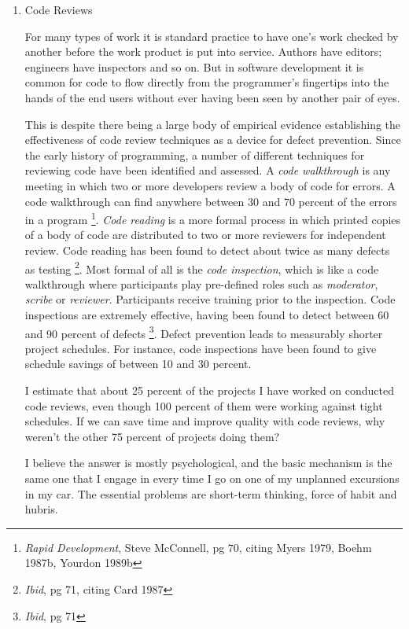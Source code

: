 \documentclass{article}
\begin{document}
\begin{enumerate}
\item Code Reviews
\label{sec:orgheadline274}

For many types of work it is standard practice to have one's work
checked by another before the work product is put into service. Authors
have editors; engineers have inspectors and so on. But in software
development it is common for code to flow directly from the programmer's
fingertips into the hands of the end users without ever having been seen
by another pair of eyes.

This is despite there being a large body of empirical evidence
establishing the effectiveness of code review techniques as a device for
defect prevention. Since the early history of programming, a number of
different techniques for reviewing code have been identified and
assessed. A \emph{code walkthrough} is any meeting in which two or more
developers review a body of code for errors. A code walkthrough can find
anywhere between 30 and 70 percent of the errors in a program \footnote{\emph{Rapid Development}, Steve McConnell, pg 70, citing Myers 1979,
Boehm 1987b, Yourdon 1989b}.
\emph{Code reading} is a more formal process in which printed copies of a
body of code are distributed to two or more reviewers for independent
review. Code reading has been found to detect about twice as many
defects as testing \footnote{\emph{Ibid}, pg 71, citing Card 1987}. Most formal of all is the \emph{code inspection},
which is like a code walkthrough where participants play pre-defined
roles such as \emph{moderator}, \emph{scribe} or \emph{reviewer}. Participants receive
training prior to the inspection. Code inspections are extremely
effective, having been found to detect between 60 and 90 percent of
defects \footnote{\emph{Ibid}, pg 71}. Defect prevention leads to measurably shorter project
schedules. For instance, code inspections have been found to give
schedule savings of between 10 and 30 percent.

I estimate that about 25 percent of the projects I have worked on
conducted code reviews, even though 100 percent of them were working
against tight schedules. If we can save time and improve quality with
code reviews, why weren't the other 75 percent of projects doing them?

I believe the answer is mostly psychological, and the basic mechanism is
the same one that I engage in every time I go on one of my unplanned
excursions in my car. The essential problems are short-term thinking,
force of habit and hubris.


\end{enumerate}
\end{document}
